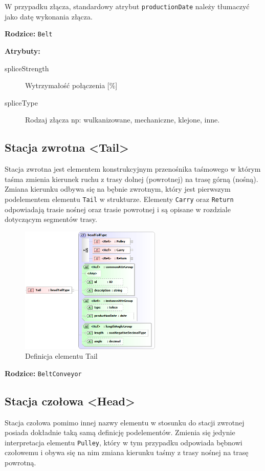 \documentclass[12pt,a4paper]{article}
\begin{document}
W przypadku złącza, standardowy atrybut {\tt productionDate} należy tłumaczyć
jako datę wykonania złącza.

\noindent\textbf{Rodzice:} \texttt{Belt}

\noindent\textbf{Atrybuty:}
\begin{description}
\item[spliceStrength] Wytrzymałość połączenia [\%]
\item[spliceType] Rodzaj złącza np: wulkanizowane, mechaniczne, klejone, inne.
\end{description}


\subsection{Stacja zwrotna <Tail>}
Stacja zwrotna jest elementem konstrukcyjnym przenośnika taśmowego w którym
taśma zmienia kierunek ruchu z trasy dolnej (powrotnej) na trasę górną (nośną).
Zmiana kierunku odbywa się na bębnie zwrotnym, który jest pierwszym podelementem
elementu {\tt Tail} w strukturze.  Elementy {\tt Carry} oraz {\tt Return}
odpowiadają trasie nośnej oraz trasie powrotnej i są opisane w rozdziale
dotyczącym segmentów trasy.

\begin{figure}[H]
  \centering
  \includegraphics[width=0.6\textwidth]{png/liquid/Tail}
  \caption{Definicja elementu Tail}
  \label{fig:tail-xsd}
\end{figure}

\noindent\textbf{Rodzice:} \texttt{BeltConveyor}


\subsection{Stacja czołowa <Head>}
Stacja czołowa pomimo innej nazwy elementu w stosunku do stacji zwrotnej posiada
dokładnie taką samą definicję podelementów.  Zmienia się jedynie interpretacja
elementu {\tt Pulley}, który w tym przypadku odpowiada bębnowi czołowemu i obywa
się na nim zmiana kierunku taśmy z trasy nośnej na trasę powrotną.
\end{document}
